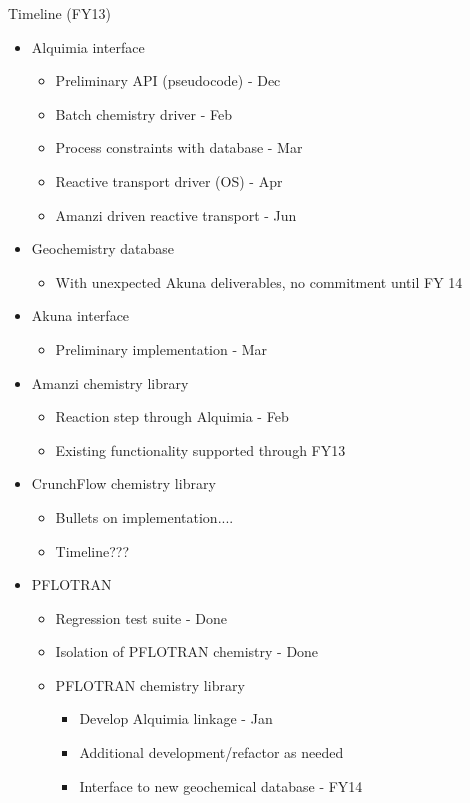\documentclass{beamer}
\newcommand{\pft}{PFLOTRAN\xspace}
\begin{document}
\begin{frame}[allowframebreaks]{Timeline (FY13)}
\begin{itemize}
\item Alquimia interface
\begin{itemize}
\item Preliminary API (pseudocode) - Dec
\item Batch chemistry driver - Feb
\item Process constraints with database - Mar
\item Reactive transport driver (OS) - Apr
\item Amanzi driven reactive transport - Jun
\end{itemize}
\item Geochemistry database
\begin{itemize}
\item With unexpected Akuna deliverables, no commitment until FY 14
\end{itemize}
\item Akuna interface
\begin{itemize}
\item Preliminary implementation - Mar
\end{itemize}

\newpage

\item Amanzi chemistry library
\begin{itemize}
\item Reaction step through Alquimia - Feb
\item Existing functionality supported through FY13
\end{itemize}
\item CrunchFlow chemistry library
\begin{itemize}
\item Bullets on implementation....
\item Timeline???
\end{itemize}
\item \pft
\begin{itemize}
\item Regression test suite - Done
\item Isolation of \pft chemistry - Done
\item \pft chemistry library
\begin{itemize}
\item Develop Alquimia linkage - Jan
\item Additional development/refactor as needed
\item Interface to new geochemical database - FY14
\end{itemize}
\end{itemize}
\end{itemize}
\end{frame}
\end{document}
